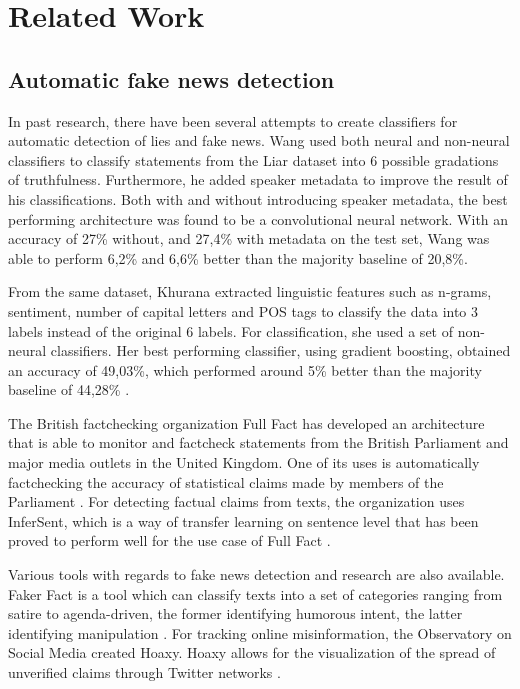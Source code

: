 \section{Related Work}
\subsection{Automatic fake news detection}
In past research, there have been several attempts to create classifiers for automatic detection of lies and fake news. 
Wang used both neural and non-neural classifiers to classify statements from the Liar dataset into 6 possible gradations of truthfulness. 
Furthermore, he added speaker metadata to improve the result of his classifications.
Both with and without introducing speaker metadata, the best performing architecture was found to be a convolutional neural network. 
With an accuracy of 27\% without, and 27,4\% with metadata on the test set, Wang was able to perform 6,2\% and 6,6\% better than the majority baseline of 20,8\%\cite{wang2018}.

From the same dataset, Khurana extracted linguistic features such as n-grams, sentiment, number of capital letters and POS tags to classify the data into 3 labels instead of the original 6 labels. 
For classification, she used a set of non-neural classifiers. 
Her best performing classifier, using gradient boosting, obtained an accuracy of 49,03\%, which performed around 5\% better than the majority baseline of 44,28\% \cite{khurana2017}.

The British factchecking organization Full Fact has developed an architecture that is able to monitor and factcheck statements from the British Parliament and major media outlets in the United Kingdom. 
One of its uses is automatically factchecking the accuracy of statistical claims made by members of the Parliament \cite{babakar2016}.
For detecting factual claims from texts, the organization uses InferSent, which is a way of transfer learning on sentence level that has been proved to perform well for the use case of Full Fact \cite{pydata2018}.

Various tools with regards to fake news detection and research are also available. 
Faker Fact is a tool which can classify texts into a set of categories ranging from satire to agenda-driven, the former identifying humorous intent, the latter identifying manipulation \cite{fakerfact}. 
For tracking online misinformation, the Observatory on Social Media created Hoaxy. 
Hoaxy allows for the visualization of the spread of unverified claims through Twitter networks \cite{shao2016}.

